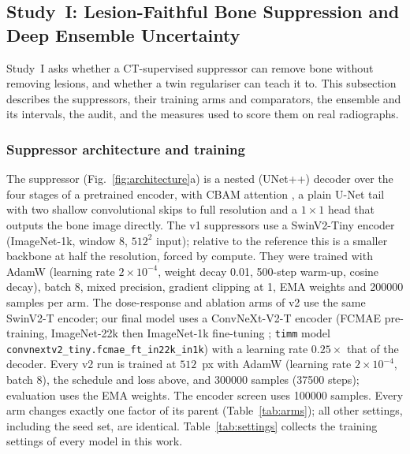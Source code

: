 \subsection{Study~I: Lesion-Faithful Bone Suppression and Deep Ensemble Uncertainty}
\label{sec:m-study1}
Study~I asks whether a CT-supervised suppressor can remove bone without removing lesions, and whether a twin regulariser can teach it to.
This subsection describes the suppressors, their training arms and comparators, the ensemble and its intervals, the audit, and the
measures used to score them on real radiographs.

\subsubsection{Suppressor architecture and training}
The suppressor (Fig.~\ref{fig:architecture}a) is a nested (UNet++) decoder \cite{zhou2018unetpp} over the four stages of a pretrained
encoder, with CBAM attention \cite{woo2018cbam}, a plain U-Net tail with two shallow convolutional skips to full resolution and a
$1\times1$ head that outputs the bone image directly. The v1 suppressors use a SwinV2-Tiny encoder \cite{liu2022swinv2} (ImageNet-1k,
window 8, $512^2$ input); relative to the reference this is a smaller backbone at half the resolution, forced by compute. They were trained
with AdamW (learning rate $2\times10^{-4}$, weight decay 0.01, 500-step warm-up, cosine decay), batch 8, mixed precision, gradient clipping
at 1, EMA weights and \num{200000} samples per arm. The dose-response and ablation arms of v2 use the same SwinV2-T encoder; our final model
uses a ConvNeXt-V2-T encoder \cite{woo2023convnextv2} (FCMAE pre-training, ImageNet-22k then ImageNet-1k fine-tuning
\cite{deng2009imagenet}; \texttt{timm} \cite{wightman2019timm} model \texttt{convnextv2\_tiny.fcmae\_ft\_in22k\_in1k}) with a learning rate
$0.25\times$ that of the decoder. Every v2 run is trained at $512$~px with AdamW \cite{loshchilov2019adamw} (learning rate
$2\times10^{-4}$, batch 8), the schedule and loss above, and \num{300000} samples (\num{37500} steps); evaluation uses the EMA weights. The
encoder screen uses \num{100000} samples. Every arm changes exactly one factor of its parent (Table~\ref{tab:arms}); all other settings,
including the seed set, are identical. Table~\ref{tab:settings} collects the training settings of every model in this work.

